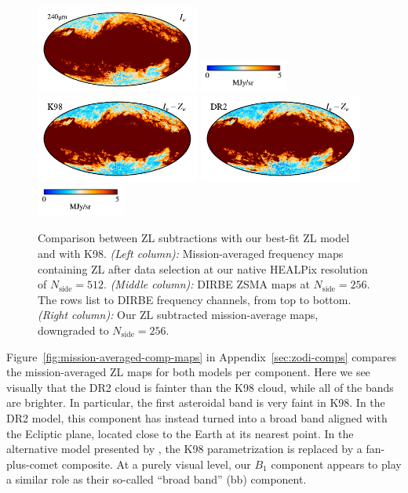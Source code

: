 \documentclass[twocolumn]{aa}
\begin{document}
\begin{figure}
    \includegraphics[height=2.90cm]{figs/compare_zsma/cosmoglobe_ma_10.pdf}%
    \includegraphics[width=2.90cm,angle=90]{figs/compare_zsma/cbar_tot_10.pdf}%
    \includegraphics[height=2.90cm]{figs/compare_zsma/dirbe_zsma_10.pdf}%
    \includegraphics[height=2.90cm]{figs/compare_zsma/cosmoglobe_zsma_10.pdf}%
    \includegraphics[width=2.90cm,angle=90]{figs/compare_zsma/cbar_10.pdf}%
      \\

    \caption{Comparison between ZL subtractions with our best-fit ZL model and with K98. 
    \textit{(Left column):} Mission-averaged frequency maps containing ZL after data selection at our native HEALPix resolution 
    of $N_\mathrm{side} = 512$. \textit{(Middle column):} DIRBE ZSMA maps
    at $N_\mathrm{side} = 256$. The rows list to DIRBE frequency channels, from top to 
    bottom. \textit{(Right column):} Our ZL subtracted mission-average 
    maps, downgraded to $N_\mathrm{side} = 256$. 
    }    
    \label{fig:dr2-zsma-compare2}
\end{figure}



Figure~\ref{fig:mission-averaged-comp-maps} in
Appendix~\ref{sec:zodi-comps} compares the mission-averaged ZL maps
for both models per component. Here we see visually that the DR2 cloud
is fainter than the K98 cloud, while all of the bands are brighter. 
In particular, the first asteroidal band is very faint in K98. In the DR2 model,
this component has instead turned into a broad band aligned with the
Ecliptic plane, located close to the Earth at its nearest
point. In the 
alternative model presented by \citet{Robinson2013}, the
K98 parametrization is replaced by a fan-plus-comet composite. At a
purely visual level, our $B_1$ component appears to play a similar
role as their so-called ``broad band'' (bb) component.
\end{document}
